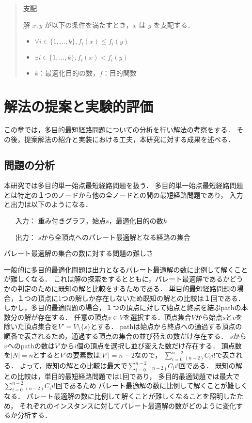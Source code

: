\documentclass[12pt]{optlab-bachelor}
\begin{document}
\begin{quote}
  \textbf{支配}

    解 $x,y$ が以下の条件を満たすとき，$x$ は $y$ を支配する．
    \begin{itemize}
      \item $\forall i \in \{1,\ldots,k\},f_i(x) \le f_i(y)$
      \item $\exists i \in \{1,\ldots,k\},f_i(x) < f_i(y)$
      \item $k$：最適化目的の数，$f$：目的関数
    \end{itemize}
\end{quote}


\chapter{解法の提案と実験的評価}
この章では，多目的最短経路問題についての分析を行い解法の考察をする．
その後，提案解法の紹介と実装における工夫，本研究に対する成果を述べる．

\section{問題の分析}
本研究では多目的単一始点最短経路問題を扱う．
多目的単一始点最短経路問題とは特定の１つのノードから他の全ノードとの間の最短経路問題であり，
入力と出力は以下のようになる．
\begin{itemize}
  \item[入力：]重み付きグラフ，始点$s$，最適化目的の数$k$
  \item[出力：]$s$から全頂点へのパレート最適解となる経路の集合
\end{itemize}

\begin{description}
  \item[パレート最適解の集合の数に対する問題の難しさ]
\end{description}

一般的に多目的最適化問題は出力となるパレート最適解の数に比例して解くことが難しくなる．
これは解の探索をするとともに，パレート最適解であるかどうかの判定のために既知の解と比較をするためである．
単目的最短経路問題の場合，１つの頂点に1つの解しか存在しないため既知の解との比較は１回である．
しかし，多目的最適問題の場合，１つの頂点に対して始点と終点を結ぶpathの本数分の解が存在する．
任意の頂点$v \in V$を選択する．頂点集合$V$から始点$s$と$v$を除いた頂点集合を$V'=V \setminus \{s\}$とする．
pathは始点から終点への通過する頂点の順番で表されるため，通過する頂点の集合の並び替えの数だけ存在する．
$s$から$v$へのpathの数は$V'$から$i$個の頂点を選択し並び変えた数だけ存在する．
頂点数を$|N|=n$とすると$V'$の要素数は$|V'|=n-2$なので，
$\displaystyle \sum_{i=0}^{n-2} {}_{(n-2)}C_i i!$で表される．
よって，既知の解との比較は最大で$\displaystyle \sum_{i=0}^{n-2} {}_{(n-2)}C_i i!$回である．
既知の解との比較は，単目的最短経路問題では1回であり，
多目的最適問題では最大で$\displaystyle \sum_{i=0}^{n-2} {}_{(n-2)}C_i i!$回であるため
パレート最適解の数に比例して解くことが難しくなる．
パレート最適解の数に比例して解くことが難しくなることを照明したため，
それぞれのインスタンスに対してパレート最適解の数がどのように変化するか分析する．
\end{document}
